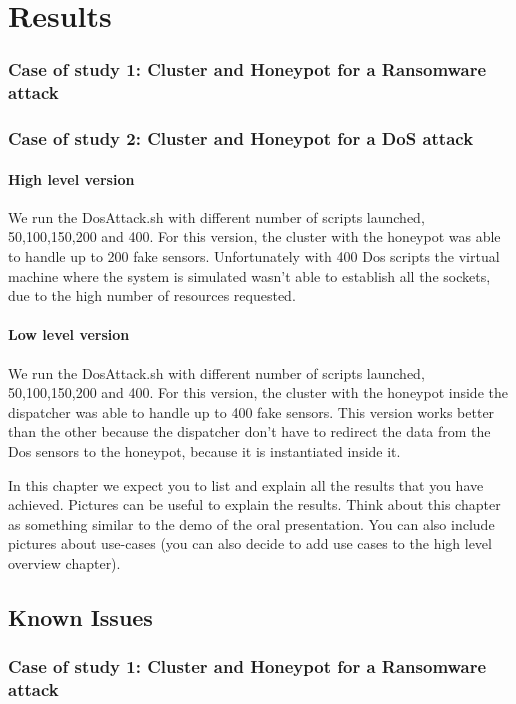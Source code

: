 \chapter{Results}

\subsection{Case of study 1: Cluster and Honeypot for a Ransomware attack}

\subsection{Case of study 2: Cluster and Honeypot for a DoS attack}

\subsubsection{High level version}
We run the DosAttack.sh with different number of scripts launched, 50,100,150,200 and 400. For this version, the cluster with the honeypot was able to handle up to 200 fake sensors. 
Unfortunately with 400 Dos scripts the virtual machine where the system is simulated wasn't able to establish all the sockets, due to the high number of resources requested.

\subsubsection{Low level version} 
We run the DosAttack.sh with different number of scripts launched, 50,100,150,200 and 400. For this version, the cluster with the honeypot inside the dispatcher was able to handle
 up to 400 fake sensors. 
This version works better than the other because the dispatcher don't have to redirect the data from the Dos sensors to the honeypot, because it is instantiated inside it.

In this chapter we expect you to list and explain all the results that you have achieved. Pictures can be useful to explain the results. Think about this chapter as something similar to the demo of the oral presentation. You can also include pictures about use-cases (you can also decide to add use cases to the high level overview chapter).


\section{Known Issues}

\subsection{Case of study 1: Cluster and Honeypot for a Ransomware attack}


